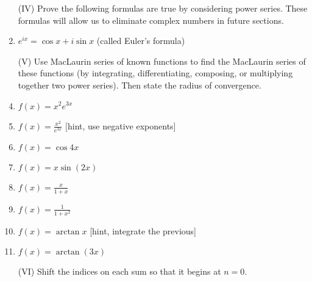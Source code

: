 \begin{multicols}{2}
\begin{enumerate}
\item [(IV)] Prove the following formulas are true by considering power series. These formulas will allow us to eliminate complex numbers in future sections.
\item $e^{ix}=\cos x + i\sin x$ (called Euler's formula)







\item [(V)] Use MacLaurin series of known functions to find the MacLaurin series of these functions (by integrating, differentiating, composing, or multiplying together two power series). Then state the radius of convergence.
\item $f(x)={x^2}{e^{3x}}$
\item $f(x)=\frac{x^2}{e^{3x}}$ [hint, use negative exponents]
\item $f(x)=\cos 4x$
\item $f(x)=x\sin(2x)$ 
\item $f(x)=\frac{x}{1+x}$
\item $f(x)=\frac{1}{1+x^2}$
\item $f(x)=\arctan x$ [hint, integrate the previous]
\item $f(x)=\arctan (3x)$ 





\item [(VI)] Shift the indices on each sum so that it begins at $n=0$.







\end{enumerate}
\end{multicols}
